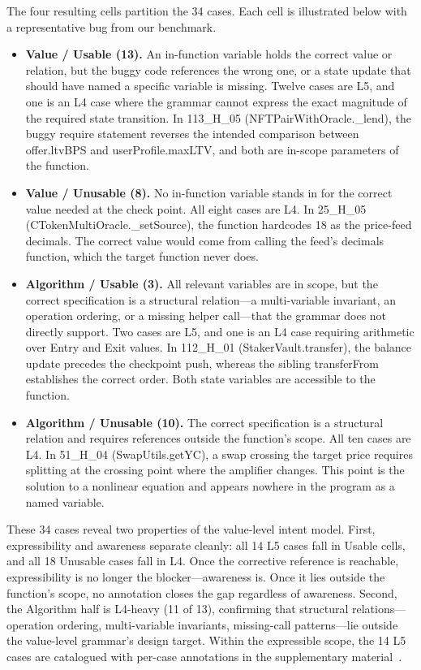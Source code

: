 \documentclass[pdflatex,sn-basic]{sn-jnl}%
\theoremstyle{thmstyleone}%
\theoremstyle{thmstyletwo}%
\theoremstyle{thmstylethree}%
\begin{document}
\begin{itemize}
  \noindent The four resulting cells partition the 34 cases. Each cell is illustrated below with a representative bug from our benchmark.
  \begin{itemize}
    \item \textbf{Value / Usable (13).} An in-function variable holds the correct value or relation, but the buggy code references the wrong one, or a state update that should have named a specific variable is missing. Twelve cases are L5, and one is an L4 case where the grammar cannot express the exact magnitude of the required state transition. In 113\_H\_05 (NFTPairWithOracle.\_lend), the buggy require statement reverses the intended comparison between offer.ltvBPS and userProfile.maxLTV, and both are in-scope parameters of the function.
    \item \textbf{Value / Unusable (8).} No in-function variable stands in for the correct value needed at the check point. All eight cases are L4. In 25\_H\_05 (CTokenMultiOracle.\_setSource), the function hardcodes 18 as the price-feed decimals. The correct value would come from calling the feed's decimals function, which the target function never does.
    \item \textbf{Algorithm / Usable (3).} All relevant variables are in scope, but the correct specification is a structural relation---a multi-variable invariant, an operation ordering, or a missing helper call---that the grammar does not directly support. Two cases are L5, and one is an L4 case requiring arithmetic over Entry and Exit values. In 112\_H\_01 (StakerVault.transfer), the balance update precedes the checkpoint push, whereas the sibling transferFrom establishes the correct order. Both state variables are accessible to the function.
    \item \textbf{Algorithm / Unusable (10).} The correct specification is a structural relation and requires references outside the function's scope. All ten cases are L4. In 51\_H\_04 (SwapUtils.getYC), a swap crossing the target price requires splitting at the crossing point where the amplifier changes. This point is the solution to a nonlinear equation and appears nowhere in the program as a named variable.
  \end{itemize}
  \noindent These 34 cases reveal two properties of the value-level intent model. First, expressibility and awareness separate cleanly: all 14 L5 cases fall in Usable cells, and all 18 Unusable cases fall in L4. Once the corrective reference is reachable, expressibility is no longer the blocker---awareness is. Once it lies outside the function's scope, no annotation closes the gap regardless of awareness. Second, the Algorithm half is L4-heavy (11 of 13), confirming that structural relations---operation ordering, multi-variable invariants, missing-call patterns---lie outside the value-level grammar's design target. Within the expressible scope, the 14 L5 cases are catalogued with per-case annotations in the supplementary material~\citep{rq2supp}.
\end{itemize}
\end{document}
